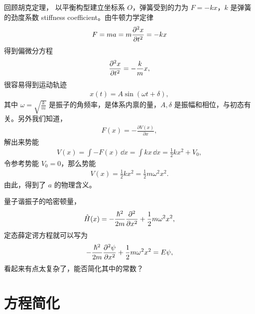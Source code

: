 回顾胡克定理，
以平衡构型建立坐标系 $O$，弹簧受到的力为 $F = -kx$，$k$ 是弹簧的劲度系数 stiffness coefficient。由牛顿力学定律
\begin{align}
    F = ma = m \pdv[2]{x}{t} = -k x
\end{align}
得到偏微分方程
\begin{align}
    \pdv[2]{x}{t} = - \frac km x,
\end{align}
很容易得到运动轨迹
\begin{align}
    x(t) = A \sin(\omega t + \delta),
\end{align}
其中 $\omega = \sqrt{\frac{k}m}$ 是振子的角频率，是体系内禀的量，$A,\delta$ 是振幅和相位，与初态有关。另外我们知道，
\begin{align}
    F(x) = -\frac{\partial V(x)}{\partial x}, 
\end{align}
解出来势能
\begin{align}
    V(x) = \int -F(x)\,\dd x = \int kx \, \dd x = \frac12 k x^2 + V_0,
\end{align}
令参考势能 $V_0 = 0$，那么势能
\begin{eqnarray}
    V(x) = \frac 12 kx^2 = \frac 12 m\omega^2 x^2.
\end{eqnarray}
由此，得到了 $a$ 的物理含义。

量子谐振子的哈密顿量，
\begin{align}
    \hat H(x) = -\frac{\hbar^2}{2m} \pdv[2]{x} + \frac 12 m\omega^2 x^2,
\end{align}
定态薛定谔方程就可以写为
\begin{align}
    -\frac{\hbar^2}{2m} \pdv[2]{\psi}{x} + \frac 12 m\omega^2 x^2 = E\psi,
    \label{eq:harm_seq_original}
\end{align}
看起来有点太复杂了，能否简化其中的常数？

\section{方程简化}

